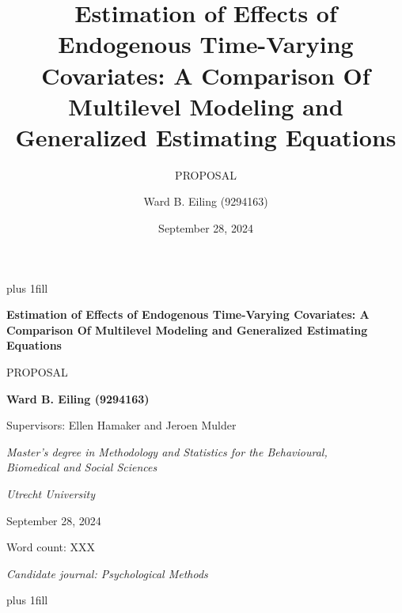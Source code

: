 \documentclass[
  12pt,
  a4paper,
]{article}
\title{Estimation of Effects of Endogenous Time-Varying Covariates: A
Comparison Of Multilevel Modeling and Generalized Estimating Equations}
\subtitle{PROPOSAL}
\author{Ward B. Eiling (9294163)}
\date{September 28, 2024}
\begin{document}
\cleardoublepage
\thispagestyle{empty}
{\centering
\hbox{}\vskip 0cm plus 1fill
{\Large\bfseries Estimation of Effects of Endogenous Time-Varying
Covariates: A Comparison Of Multilevel Modeling and Generalized
Estimating Equations \par}
\vspace{3ex}
{\large PROPOSAL \par}
\vspace{9ex}
{\large\bfseries Ward B. Eiling (9294163) \par}
\vspace{3ex}
{\large Supervisors: Ellen Hamaker and Jeroen Mulder \par}
\vspace{9ex}
{\normalsize \textit{Master's degree in Methodology and Statistics for the Behavioural, \\ Biomedical and Social Sciences} \par}
\vspace{3ex}
{\normalsize \textit{Utrecht University} \par}
\vspace{9ex}
{\normalsize September 28, 2024 \par}
\vspace{3ex}
{\normalsize Word count: XXX \par}
\vspace{9ex}
{\normalsize \textit{Candidate journal: Psychological Methods} \par}
\hbox{}\vskip 0cm plus 1fill
}
\ifdefined\Shaded\renewenvironment{Shaded}{\begin{tcolorbox}[frame hidden, breakable, enhanced, sharp corners, boxrule=0pt, borderline west={3pt}{0pt}{shadecolor}, interior hidden]}{\end{tcolorbox}}\fi
\end{document}
